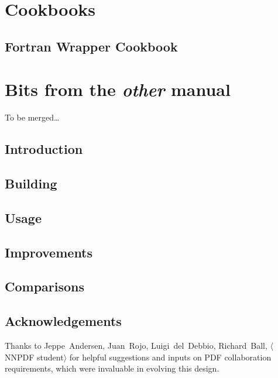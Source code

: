 \documentclass{report}
\begin{document}
\chapter{Cookbooks}

\section{Fortran Wrapper Cookbook}



\chapter{Bits from the \emph{other} manual}

To be merged\dots


\section{Introduction}


\section{Building}


\section{Usage}


\section{Improvements}


\section{Comparisons}


\section{Acknowledgements}

Thanks to Jeppe~Andersen, Juan~Rojo, Luigi~del~Debbio, Richard~Ball,
$\langle$NNPDF student$\rangle$ for helpful suggestions and inputs on PDF
collaboration requirements, which were invaluable in evolving this design.
\end{document}
